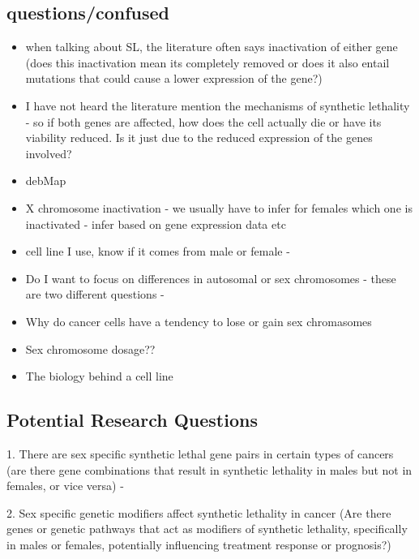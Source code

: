 \documentclass[10pt]{article}
\begin{document}
\subsection{questions/confused}
\begin{itemize}
	\item when talking about SL, the literature often says inactivation of either gene (does this inactivation mean its completely removed or does it also entail mutations that could cause a lower expression of the gene?)
	\item I have not heard the literature mention the mechanisms of synthetic lethality - so if both genes are affected, how does the cell actually die or have its viability reduced. Is it just due to the reduced expression of the genes involved?
	\item debMap
	\item X chromosome inactivation - we usually have to infer for females which one is inactivated - infer based on gene expression data etc
	\item cell line I use, know if it comes from male or female -
	\item Do I want to focus on differences in autosomal or sex chromosomes - these are two different questions - 
	\item Why do cancer cells have a tendency to lose or gain sex chromasomes
	\item Sex chromosome dosage??
	\item The biology behind a cell line
\end{itemize}

\subsection{Potential Research Questions}
1. There are sex specific synthetic lethal gene pairs in certain types of cancers (are there gene combinations that result in synthetic lethality in males but not in females, or vice versa)
- 

2. Sex specific genetic modifiers affect synthetic lethality in cancer (Are there genes or genetic pathways that act as modifiers of synthetic lethality, specifically in males or females, potentially influencing treatment response or prognosis?)
\newpage
\end{document}
